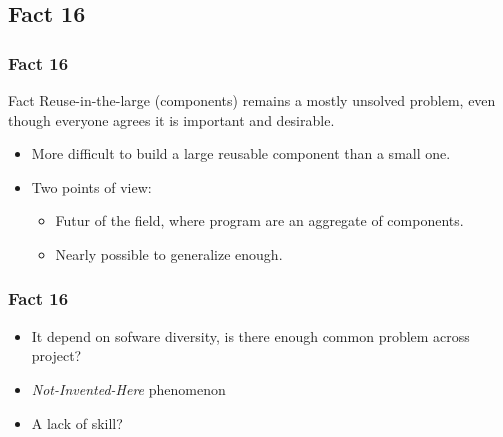 \documentclass{beamer}
\begin{document}
\subsection{Fact 16}
\begin{frame}
    \frametitle{Fact 16}
    \begin{block}{Fact}
    Reuse-in-the-large (components) remains a mostly unsolved problem, even
    though everyone agrees it is important and desirable.
    \end{block}
    \begin{itemize}
    		\item More difficult to build a large reusable component than a small one.
    		\item Two points of view:
    		\begin{itemize}
    			\item Futur of the field, where program are an aggregate of components.
    			\item Nearly possible to generalize enough.
    		\end{itemize}
    \end{itemize}
\end{frame}

\begin{frame}
	\frametitle{Fact 16}
	\begin{itemize}
		\item It depend on sofware diversity, is there enough common problem across project?
		\item \textit{Not-Invented-Here} phenomenon
		\item A lack of skill?
	\end{itemize}

\end{frame}
\end{document}
